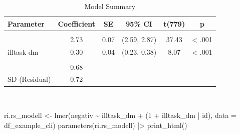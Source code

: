 \documentclass[
  letterpaper,
  DIV=11,
  numbers=noendperiod]{scrreprt}
\newenvironment{Shaded}{\begin{snugshade}}{\end{snugshade}}
\newcommand{\AttributeTok}[1]{\textcolor[rgb]{0.40,0.45,0.13}{#1}}
\newcommand{\DecValTok}[1]{\textcolor[rgb]{0.68,0.00,0.00}{#1}}
\newcommand{\FunctionTok}[1]{\textcolor[rgb]{0.28,0.35,0.67}{#1}}
\newcommand{\NormalTok}[1]{\textcolor[rgb]{0.00,0.23,0.31}{#1}}
\newcommand{\OtherTok}[1]{\textcolor[rgb]{0.00,0.23,0.31}{#1}}
\newcommand{\SpecialCharTok}[1]{\textcolor[rgb]{0.37,0.37,0.37}{#1}}
\begin{document}
\begin{tcolorbox}
\begin{table}
\caption*{
{\large Model Summary}
} 
\fontsize{12.0pt}{14.4pt}\selectfont
\begin{tabular*}{\linewidth}{@{\extracolsep{\fill}}lccccc}
\toprule
Parameter & Coefficient & SE & 95\% CI & t(779) & p \\ 
\midrule\addlinespace[2.5pt]
\multicolumn{6}{l}{{\slshape Fixed Effects }} \\[2.5pt] 
\midrule\addlinespace[2.5pt]
{(Intercept)} & 2.73 & 0.07 & (2.59, 2.87) & 37.43 & < .001 \\ 
{illtask dm} & 0.30 & 0.04 & (0.23, 0.38) & 8.07 & < .001 \\ 
\midrule\addlinespace[2.5pt]
\multicolumn{6}{l}{{\slshape Random Effects }} \\[2.5pt] 
\midrule\addlinespace[2.5pt]
{SD (Intercept: id)} & 0.68 &  &  &  &  \\ 
{SD (Residual)} & 0.72 &  &  &  &  \\ 
\bottomrule
\end{tabular*}
\begin{minipage}{\linewidth}
\\
\end{minipage}
\end{table}

\begin{Shaded}
\begin{Highlighting}[]
\NormalTok{ri.rs\_modell }\OtherTok{\textless{}{-}} \FunctionTok{lmer}\NormalTok{(negativ }\SpecialCharTok{\textasciitilde{}}\NormalTok{ illtask\_dm }\SpecialCharTok{+}\NormalTok{ (}\DecValTok{1} \SpecialCharTok{+}\NormalTok{ illtask\_dm }\SpecialCharTok{|}\NormalTok{ id), }\AttributeTok{data =}\NormalTok{ df\_example\_cli)}
\FunctionTok{parameters}\NormalTok{(ri.rs\_modell) }\SpecialCharTok{|\textgreater{}} \FunctionTok{print\_html}\NormalTok{()}
\end{Highlighting}
\end{Shaded}


\end{tcolorbox}
\end{document}
